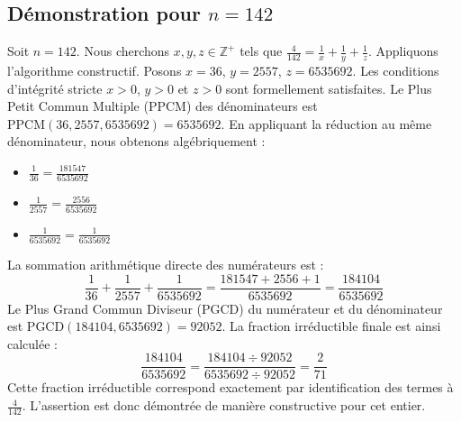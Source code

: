 \documentclass[11pt,a4paper]{article}
\begin{document}
\subsection{Démonstration pour $n = 142$}
Soit $n = 142$. Nous cherchons $x, y, z \in \mathbb{Z}^{+}$ tels que $\frac{4}{142} = \frac{1}{x} + \frac{1}{y} + \frac{1}{z}$.
Appliquons l'algorithme constructif. Posons $x = 36$, $y = 2557$, $z = 6535692$.
Les conditions d'intégrité stricte $x > 0$, $y > 0$ et $z > 0$ sont formellement satisfaites.
Le Plus Petit Commun Multiple (PPCM) des dénominateurs est $\text{PPCM}(36, 2557, 6535692) = 6535692$.
En appliquant la réduction au même dénominateur, nous obtenons algébriquement :
\begin{itemize}
    \item $\frac{1}{36} = \frac{181547}{6535692}$
    \item $\frac{1}{2557} = \frac{2556}{6535692}$
    \item $\frac{1}{6535692} = \frac{1}{6535692}$
\end{itemize}
La sommation arithmétique directe des numérateurs est :
$$ \frac{1}{36} + \frac{1}{2557} + \frac{1}{6535692} = \frac{181547 + 2556 + 1}{6535692} = \frac{184104}{6535692} $$
Le Plus Grand Commun Diviseur (PGCD) du numérateur et du dénominateur est $\text{PGCD}(184104, 6535692) = 92052$.
La fraction irréductible finale est ainsi calculée :
$$ \frac{184104}{6535692} = \frac{184104 \div 92052}{6535692 \div 92052} = \frac{2}{71} $$
Cette fraction irréductible correspond exactement par identification des termes à $\frac{4}{142}$. L'assertion est donc démontrée de manière constructive pour cet entier.
\end{document}
